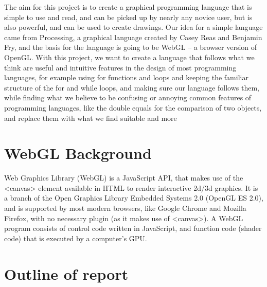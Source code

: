 \documentclass{l3proj}
\begin{document}
The aim for this project is to create a graphical programming language that is simple to use and read, and can be picked up by nearly any novice user, but is also powerful, and can be used to create drawings. Our idea for a simple language came from Processing, a graphical language created by Casey Reas and Benjamin Fry, and the basis for the language is going to be WebGL – a browser version of OpenGL. With this project, we want to create a language that follows what we think are useful and intuitive features in the design of most programming languages, for example using {} for functions and loops and keeping the familiar structure of the for and while loops, and making sure our language follows them, while finding what we believe to be confusing or annoying common features of programming languages, like the double equals for the comparison of two objects, and replace them with what we find suitable and more 

\section{WebGL Background}

Web Graphics Library (WebGL) is a JavaScript API, that makes use of the \textless{}canvas\textgreater{} element available in HTML to render interactive 2d/3d graphics. It is a branch of the Open Graphics Library Embedded Systems 2.0 (OpenGL ES 2.0), and is supported by most modern browsers, like Google Chrome and Mozilla Firefox, with no necessary plugin (as it makes use of \textless{}canvas\textgreater{}). A WebGL program consists of control code written in JavaScript, and function code (shader code) that is executed by a computer's GPU. 

\section{Outline of report}
\end{document}
